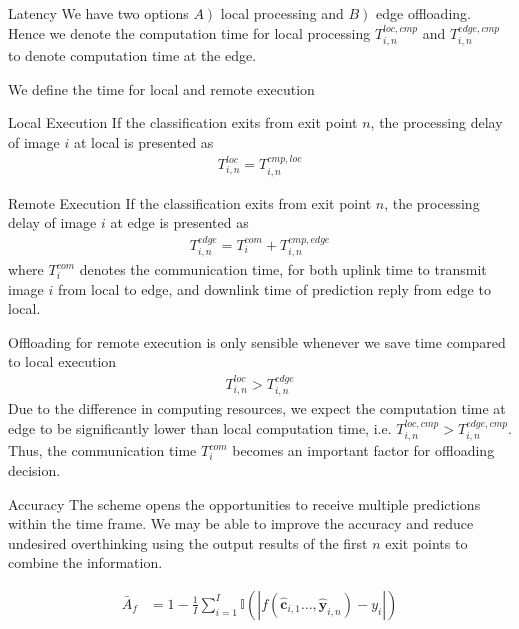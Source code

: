 	\begin{enumdescript}
		\item[Latency]  We have two options $ \left.A \right) $ local processing and $ \left.B\right) $ edge offloading. Hence we denote the computation time for local processing $ T_{i,n}^{loc,cmp} $ and $ T_{i,n}^{edge,cmp} $ to denote computation time at the edge. 
	
		
		We define the time for local and remote execution

		\begin{enumdescript}
			\item[Local Execution] If the classification exits from exit point $ n $, the processing delay of image $ i $ at local is presented as
			\begin{align}
			T_{i,n}^{loc}= T_{i,n}^{cmp,loc}
			\end{align}
			\item[Remote Execution] If the classification exits from exit point $ n $, the processing delay of image $ i $ at edge is presented as
			\begin{align}
			T_{i,n}^{edge}=T_{i}^{com}+ T_{i,n}^{cmp,edge}
			\end{align}
			where $ T^{com}_i $ denotes the communication time, for both uplink time to transmit image $ i $ from local to edge, and downlink time of prediction reply from edge to local.
			
			Offloading for remote execution is only sensible whenever we save time compared to local execution
			\begin{align*}
					T_{i,n}^{loc} > T_{i,n}^{edge}
			\end{align*}
			Due to the difference in computing resources, we expect the computation time at edge to be significantly lower than local computation time, i.e. $ T_{i,n}^{loc,cmp} > T_{i,n}^{edge,cmp} $. Thus, the communication time $ T^{com}_i $ becomes an important factor for offloading decision.

		\end{enumdescript}
	
		\item[Accuracy] The scheme opens the opportunities to receive multiple predictions within the time frame. We may be able to improve the accuracy and reduce undesired overthinking using the output results of the first $ n $ exit points to combine the information.
		
		\begin{align}
		\bar{A}_f &= 1 - \frac{1}{I} \sum_{i=1}^{I}\mathbb{I}\left(\left|f\left(\mathbf{\hat{c}}_{i,1} \dots, \mathbf{\hat{y}}_{i,n}\right)-y_i\right|\right)
		\end{align}
		

\end{enumdescript}
